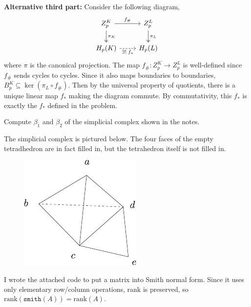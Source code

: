 \documentclass[twoside,10pt]{article}
\begin{document}
\textbf{Alternative third part:} 
Consider the following diagram,
\[
\begin{tikzcd}
	Z_{p}^{K} \dar[two heads]{\pi_{K}} \rar{f_{\#}} & Z_{p}^{L} \dar[two heads]{\pi_{L}} \\
	H_{p}(K) \rar[dashed, "\exists!\;f_{*}"'] & H_{p}(L)
\end{tikzcd}
\] where $\pi$ is the canonical projection. The map $f_{\#}:Z_{p}^{K}\to Z_{p}^{L}$ is well-defined since $f_{\#}$ sends cycles to cycles. Since it also maps boundaries to boundaries, $B_{p}^{K} \subseteq \ker (\pi_{L}\circ f_{\#})$. Then by the universal property of quotients, there is a unique linear map $f_{*}$ making the diagram commute. By commutativity, this $f_{*}$ is exactly the $f_{*}$ defined in the problem.

\newpage

\begin{exer}
Compute $\beta_1$ and $\beta_2$ of the simplicial complex shown in the notes.
\end{exer}

The simplicial complex is pictured below. The four faces of the empty tetradhedron are in fact filled in, but the tetrahedron itself is not filled in.
\begin{figure}[H]
	\centering
	\includegraphics[scale=1]{fig/2.pdf}
\end{figure}

I wrote the attached code to put a matrix into Smith normal form. Since it uses only elementary row/column operations, rank is preserved, so $\text{rank}(\texttt{smith}(A)) = \text{rank}(A)$.
\end{document}
